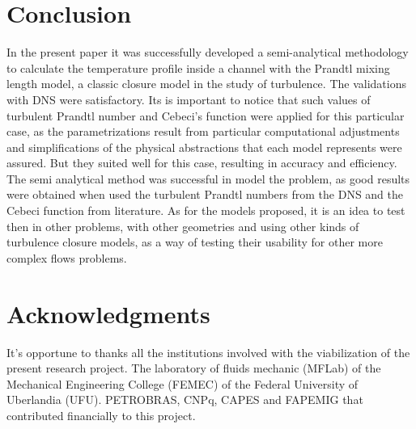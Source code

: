 \documentclass[10pt]{article} %
\begin{document}
\section{Conclusion}

In the present paper it was successfully developed a semi-analytical methodology to calculate the temperature profile inside a channel with the Prandtl mixing length model, a classic closure model in the study of turbulence. The validations with DNS were satisfactory. Its is important to notice that such values of turbulent Prandtl number and Cebeci's function were applied for this particular case, as the parametrizations result from particular computational adjustments and simplifications of the physical abstractions that each model represents were assured. But they suited well for this case, resulting in accuracy and efficiency. The semi analytical method was successful in model the problem, as good results were obtained when used the turbulent Prandtl numbers from the DNS and the Cebeci function from literature. As for the models proposed, it is an idea to test then in other problems, with other geometries and using other kinds of turbulence closure models, as a way of testing their usability for other more complex flows problems.      

\section{Acknowledgments}

It's opportune to thanks all the institutions involved with the viabilization of the present research project. The laboratory of fluids mechanic (MFLab) of the Mechanical Engineering College (FEMEC) of the Federal University of Uberlandia (UFU). PETROBRAS, CNPq, CAPES and FAPEMIG that contributed financially to this project.  
\end{document}
